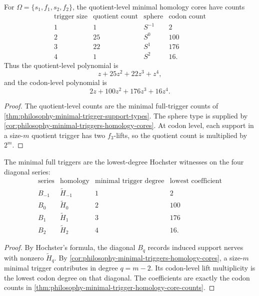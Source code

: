 \begin{theorem}
\label{thm:philosophy-minimal-trigger-homology-core-counts}
For $\Omega=\{s_{1},f_{1},s_{2},f_{2}\}$, the quotient-level minimal
homology cores have counts
$$
\begin{array}{c|r|c|r}
  \text{trigger size} & \text{quotient count} & \text{sphere} & \text{codon count}\\
  \hline
  1 & 1 & S^{-1} & 2\\
  2 & 25 & S^{0} & 100\\
  3 & 22 & S^{1} & 176\\
  4 & 1 & S^{2} & 16.
\end{array}
$$
Thus the quotient-level polynomial is
$$
  z+25z^{2}+22z^{3}+z^{4},
$$
and the codon-level polynomial is
$$
  2z+100z^{2}+176z^{3}+16z^{4}.
$$
\end{theorem}
\begin{proof}
The quotient-level counts are the minimal full-trigger counts of
\autoref{thm:philosophy-minimal-trigger-support-types}. The sphere type
is supplied by \autoref{cor:philosophy-minimal-triggers-homology-cores}.
At codon level, each support in a size-$m$ quotient trigger has two
$f_{3}$-lifts, so the quotient count is multiplied by $2^{m}$.
\end{proof}

\begin{corollary}
\label{cor:philosophy-lowest-hochster-witnesses}
The minimal full triggers are the lowest-degree Hochster witnesses on
the four diagonal series:
$$
\begin{array}{c|c|c|r}
  \text{series} & \text{homology} & \text{minimal trigger degree} & \text{lowest coefficient}\\
  \hline
  B_{-1} & \widetilde{H}_{-1} & 1 & 2\\
  B_{0} & \widetilde{H}_{0} & 2 & 100\\
  B_{1} & \widetilde{H}_{1} & 3 & 176\\
  B_{2} & \widetilde{H}_{2} & 4 & 16.
\end{array}
$$
\end{corollary}
\begin{proof}
By Hochster's formula, the diagonal $B_{q}$ records induced support
nerves with nonzero $\widetilde{H}_{q}$. By
\autoref{cor:philosophy-minimal-triggers-homology-cores}, a
size-$m$ minimal trigger contributes in degree $q=m-2$. Its codon-level
lift multiplicity is the lowest codon degree on that diagonal. The
coefficients are exactly the codon counts in
\autoref{thm:philosophy-minimal-trigger-homology-core-counts}.
\end{proof}


